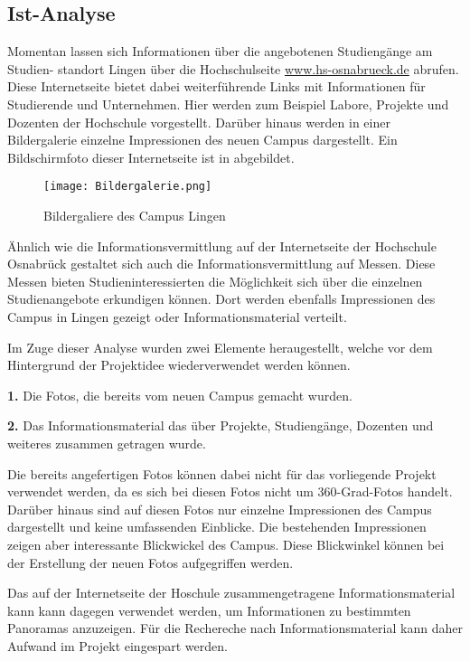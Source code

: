 \subsection{Ist-Analyse}
\label{sec:IstAnalyse}

Momentan lassen sich Informationen über die angebotenen Studiengänge am Studien-
standort Lingen über die Hochschulseite \url{www.hs-osnabrueck.de} abrufen. Diese Internetseite bietet dabei weiterführende
Links mit Informationen für Studierende und Unternehmen. Hier werden zum Beispiel Labore, Projekte und Dozenten der
Hochschule vorgestellt. Darüber hinaus werden in einer Bildergalerie einzelne Impressionen des neuen Campus dargestellt.
Ein Bildschirmfoto dieser Internetseite ist in  abgebildet.

\clearpage

\begin{figure}[htb]
\centering
\texttt{[image: Bildergalerie.png]}
\caption[Bildergalerie des Campus Lingen]{Bildergaliere des Campus Lingen\protect\footnotemark}
\label{fig:Bildergalerie}
\end{figure}

Ähnlich wie die Informationsvermittlung auf der Internetseite der Hochschule Osnabrück
gestaltet sich auch die Informationsvermittlung auf Messen. Diese Messen bieten Studieninteressierten die Möglichkeit
sich über die einzelnen Studienangebote erkundigen können. Dort werden ebenfalls
Impressionen des Campus in Lingen gezeigt oder Informationsmaterial verteilt.

Im Zuge dieser Analyse wurden zwei Elemente heraugestellt, welche vor dem Hintergrund der Projektidee wiederverwendet
werden können.

\textbf{1.} Die Fotos, die bereits vom neuen Campus gemacht wurden.

\textbf{2.} Das Informationsmaterial das über Projekte, Studiengänge, Dozenten und weiteres zusammen getragen wurde.

Die bereits angefertigen Fotos können dabei nicht für das vorliegende Projekt verwendet werden, da es sich bei diesen 
Fotos nicht um 360-Grad-Fotos handelt. Darüber hinaus sind auf diesen Fotos nur einzelne Impressionen des Campus 
dargestellt und keine umfassenden Einblicke. Die bestehenden Impressionen zeigen aber
interessante Blickwickel des Campus. Diese Blickwinkel können bei der Erstellung der neuen Fotos aufgegriffen werden. 


Das auf der Internetseite der Hoschule zusammengetragene Informationsmaterial kann kann dagegen verwendet werden, um 
Informationen zu bestimmten Panoramas anzuzeigen. Für die Rechereche nach Informationsmaterial kann daher Aufwand im Projekt eingespart werden.